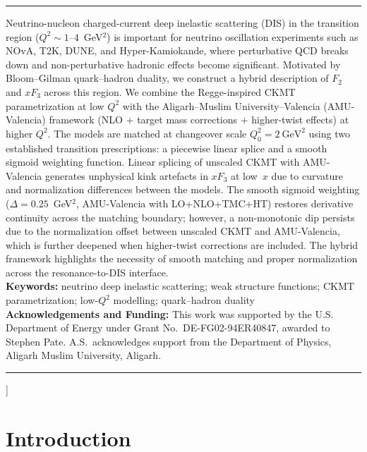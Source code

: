 \documentclass[10pt,twocolumn]{article}
\begin{document}
{%
\noindent\rule{\linewidth}{0.4pt}
\begin{center}\vspace{-0.5em}{\bfseries Abstract}\end{center}
\noindent
Neutrino-nucleon charged-current deep inelastic scattering (DIS) in the transition region ($Q^2 \sim 1$--$4$~GeV$^2$) is important for neutrino oscillation experiments such as NOvA, T2K, DUNE, and Hyper-Kamiokande, where perturbative QCD breaks down and non-perturbative hadronic effects become significant. Motivated by Bloom--Gilman quark--hadron duality, we construct a hybrid description of $F_2$ and $xF_3$ across this region.
We combine the Regge-inspired CKMT parametrization at low $Q^2$ with the Aligarh--Muslim University--Valencia (AMU-Valencia) framework (NLO $+$ target mass corrections $+$ higher-twist effects) at higher $Q^2$. The models are matched at changeover scale $Q_0^2 = 2~\mathrm{GeV}^2$ using two established transition prescriptions: a piecewise linear splice and a smooth sigmoid weighting function.
Linear splicing of unscaled CKMT with AMU-Valencia generates unphysical kink artefacts in $xF_3$ at low~$x$ due to curvature and normalization differences between the models. The smooth sigmoid weighting ($\Delta = 0.25$~GeV$^2$, AMU-Valencia with LO+NLO+TMC+HT) restores derivative continuity across the matching boundary; however, a non-monotonic dip persists due to the normalization offset between unscaled CKMT and AMU-Valencia, which is further deepened when higher-twist corrections are included.
 The hybrid framework highlights the necessity of smooth matching and proper normalization across the resonance-to-DIS interface.
\\[0.3em]
\noindent\textbf{Keywords:}
neutrino deep inelastic scattering; weak structure functions;
CKMT parametrization; low-$Q^2$ modelling; quark--hadron duality\\[0.2em]
\noindent\textbf{Acknowledgements and Funding:}
This work was supported by the U.S. Department of Energy under Grant No.~DE-FG02-94ER40847, awarded to Stephen Pate. A.S.\ acknowledges support from the Department of Physics, Aligarh Muslim University, Aligarh.\\[0.2em]
\noindent\rule{\linewidth}{0.4pt}
\vspace{0.2em}
}]

\section{Introduction}
\label{sec:intro}
\end{document}
